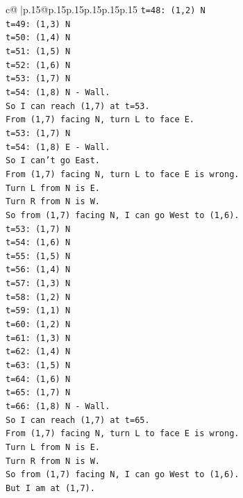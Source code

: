 \documentclass{article}
\begin{document}
{\begin{supertabular}{c@{$\;$}|p{.15\linewidth}@{}p{.15\linewidth}p{.15\linewidth}p{.15\linewidth}p{.15\linewidth}p{.15\linewidth}}
{{{\texttt{t=48: (1,2) N} \\
\texttt{t=49: (1,3) N} \\
\texttt{t=50: (1,4) N} \\
\texttt{t=51: (1,5) N} \\
\texttt{t=52: (1,6) N} \\
\texttt{t=53: (1,7) N} \\
\texttt{t=54: (1,8) N {-} Wall.} \\
\texttt{So I can reach (1,7) at t=53.} \\
\texttt{From (1,7) facing N, turn L to face E.} \\
\texttt{t=53: (1,7) N} \\
\texttt{t=54: (1,8) E {-} Wall.} \\
\texttt{So I can't go East.} \\
\texttt{From (1,7) facing N, turn L to face E is wrong.} \\
\texttt{Turn L from N is E.} \\
\texttt{Turn R from N is W.} \\
\texttt{So from (1,7) facing N, I can go West to (1,6).} \\
\texttt{t=53: (1,7) N} \\
\texttt{t=54: (1,6) N} \\
\texttt{t=55: (1,5) N} \\
\texttt{t=56: (1,4) N} \\
\texttt{t=57: (1,3) N} \\
\texttt{t=58: (1,2) N} \\
\texttt{t=59: (1,1) N} \\
\texttt{t=60: (1,2) N} \\
\texttt{t=61: (1,3) N} \\
\texttt{t=62: (1,4) N} \\
\texttt{t=63: (1,5) N} \\
\texttt{t=64: (1,6) N} \\
\texttt{t=65: (1,7) N} \\
\texttt{t=66: (1,8) N {-} Wall.} \\
\texttt{So I can reach (1,7) at t=65.} \\
\texttt{From (1,7) facing N, turn L to face E is wrong.} \\
\texttt{Turn L from N is E.} \\
\texttt{Turn R from N is W.} \\
\texttt{So from (1,7) facing N, I can go West to (1,6).} \\
\texttt{But I am at (1,7).} \\
}}}
\end{supertabular}}
\end{document}
